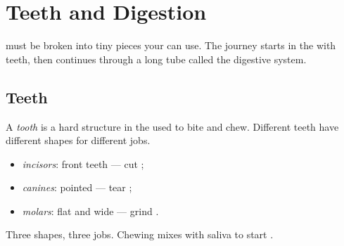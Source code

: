 \chapter{Teeth and Digestion}\label{ch:g3:teeth}

 must be broken into tiny pieces your  can use. The journey
starts in the  with teeth, then continues through a long tube
called the digestive system.

\section{Teeth}

\begin{definition}[Tooth]\label{def:g3:teeth:tooth}
A \emph{tooth} is a hard structure in the  used
to bite and chew. Different teeth have different shapes for
different jobs.
\end{definition}

\begin{definition}\label{def:g3:teeth:types}
\begin{itemize}
  \item \emph{incisors}: front teeth --- cut ;
  \item \emph{canines}: pointed --- tear ;
  \item \emph{molars}: flat and wide --- grind .
\end{itemize}
\end{definition}

\begin{omfigure}

{\small Three  shapes, three jobs. Chewing mixes  with
saliva to start .}
\end{omfigure}

